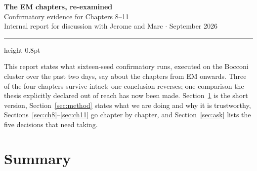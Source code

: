 \documentclass[11pt,a4paper]{article}
\begin{document}
\begin{center}
{\LARGE\bfseries The EM chapters, re-examined}\\[0.45em]
{\large Confirmatory evidence for Chapters 8--11}\\[0.9em]
{\small Internal report for discussion with Jerome and Marc \quad$\cdot$ September 2026}
\end{center}

\vspace{0.4em}
\hrule height 0.8pt
\vspace{1.2em}

\noindent
This report states what sixteen-seed confirmatory runs, executed on the Bocconi cluster over the
past two days, say about the chapters from EM onwards. Three of the four chapters survive intact;
one conclusion reverses; one comparison the thesis explicitly declared out of reach has now been
made. Section~\ref{sec:summary} is the short version, Section~\ref{sec:method} states what we are
doing and why it is trustworthy, Sections~\ref{sec:ch8}--\ref{sec:ch11} go chapter by chapter, and
Section~\ref{sec:ask} lists the five decisions that need taking.

\section{Summary}\label{sec:summary}
\end{document}
